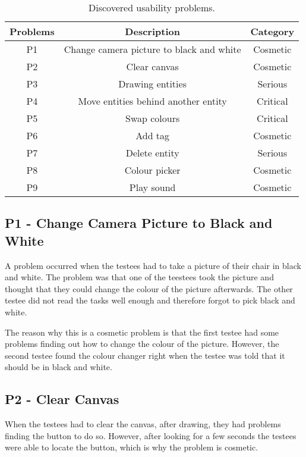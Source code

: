 \begin{table}[h]
	\centering 
	\begin{tabular}{|c|c|c|}
		\rowcolor{gray!50}
		\hline 
		Problems & Description & Category \\ 
		\hline
		P1 & Change camera picture to black and white & Cosmetic \\ 
 
		P2 & Clear canvas & Cosmetic \\ 
 
		P3 & Drawing entities & Serious \\ 

		P4 & Move entities behind another entity & Critical \\ 
 
		P5 & Swap colours & Critical \\ 
 
		P6 & Add tag & Cosmetic \\ 
 
		P7 & Delete entity & Serious \\ 
 
		P8 & Colour picker & Cosmetic \\ 
 
		P9 & Play sound & Cosmetic \\ 
		\hline 
	\end{tabular} 
	\caption{Discovered usability problems.}
	\label{tab:usability-problems}
\end{table}

\subsection*{P1 - Change Camera Picture to Black and White}
A problem occurred when the testees had to take a picture of their chair in black and white.
The problem was that one of the teestees took the picture and thought that they could change the colour of the picture afterwards.
The other testee did not read the tasks well enough and therefore forgot to pick black and white.

The reason why this is a cosmetic problem is that the first testee had some problems finding out how to change the colour of the picture.
However, the second testee found the colour changer right when the testee was told that it should be in black and white.

\subsection*{P2 - Clear Canvas}
When the testees had to clear the canvas, after drawing, they had problems finding the button to do so.
However, after looking for a few seconds the testees were able to locate the button, which is why the problem is cosmetic.


